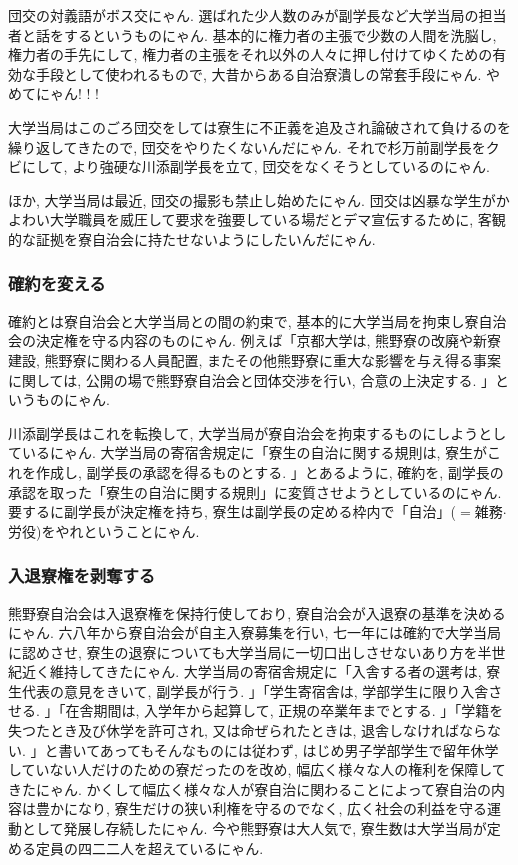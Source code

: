 \documentclass[10pt,b5jsbook,dvips,dvipdfmx,openany]{jsbook}
\theoremstyle{definition}
\begin{document}
			団交の対義語がボス交にゃん. 選ばれた少人数のみが副学長など大学当局の担当者と話をするというものにゃん. 基本的に権力者の主張で少数の人間を洗脳し, 権力者の手先にして, 権力者の主張をそれ以外の人々に押し付けてゆくための有効な手段として使われるもので, 大昔からある自治寮潰しの常套手段にゃん. やめてにゃん! ! ! 

			大学当局はこのごろ団交をしては寮生に不正義を追及され論破されて負けるのを繰り返してきたので, 団交をやりたくないんだにゃん. それで杉万前副学長をクビにして, より強硬な川添副学長を立て, 団交をなくそうとしているのにゃん. 

			ほか, 大学当局は最近, 団交の撮影も禁止し始めたにゃん. 団交は凶暴な学生がかよわい大学職員を威圧して要求を強要している場だとデマ宣伝するために, 客観的な証拠を寮自治会に持たせないようにしたいんだにゃん. 

			\subsubsection{確約を変える}
			確約とは寮自治会と大学当局との間の約束で, 基本的に大学当局を拘束し寮自治会の決定権を守る内容のものにゃん. 例えば「京都大学は, 熊野寮の改廃や新寮建設, 熊野寮に関わる人員配置, またその他熊野寮に重大な影響を与え得る事案に関しては, 公開の場で熊野寮自治会と団体交渉を行い, 合意の上決定する. 」というものにゃん. 

			川添副学長はこれを転換して, 大学当局が寮自治会を拘束するものにしようとしているにゃん. 大学当局の寄宿舎規定に「寮生の自治に関する規則は, 寮生がこれを作成し, 副学長の承認を得るものとする. 」とあるように, 確約を, 副学長の承認を取った「寮生の自治に関する規則」に変質させようとしているのにゃん. 要するに副学長が決定権を持ち, 寮生は副学長の定める枠内で「自治」($=$雑務$ \cdot $ 労役)をやれということにゃん. 

			\subsubsection{入退寮権を剥奪する}
			熊野寮自治会は入退寮権を保持行使しており, 寮自治会が入退寮の基準を決めるにゃん. 六八年から寮自治会が自主入寮募集を行い, 七一年には確約で大学当局に認めさせ, 寮生の退寮についても大学当局に一切口出しさせないあり方を半世紀近く維持してきたにゃん. 大学当局の寄宿舎規定に「入舎する者の選考は, 寮生代表の意見をきいて, 副学長が行う. 」「学生寄宿舎は, 学部学生に限り入舎させる. 」「在舎期間は, 入学年から起算して, 正規の卒業年までとする. 」「学籍を失つたとき及び休学を許可され, 又は命ぜられたときは, 退舎しなければならない. 」と書いてあってもそんなものには従わず, はじめ男子学部学生で留年休学していない人だけのための寮だったのを改め, 幅広く様々な人の権利を保障してきたにゃん. かくして幅広く様々な人が寮自治に関わることによって寮自治の内容は豊かになり, 寮生だけの狭い利権を守るのでなく, 広く社会の利益を守る運動として発展し存続したにゃん. 今や熊野寮は大人気で, 寮生数は大学当局が定める定員の四二二人を超えているにゃん. 
\end{document}
